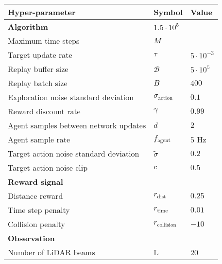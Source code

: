 
\begin{table}[htb!]
\centering
\small
\begin{tabularx}{0.75\textwidth}{RCL} 
    \hline
    \textbf{Hyper-parameter} & \textbf{Symbol} & \textbf{Value} \\ 
    \hline
    \textbf{Algorithm}                      & $1.5 \cdot 10^5$          & \\
    Maximum time steps                      & $M$                       &  \\
    Target update rate                      & $\tau$                    & $5\cdot10^{-3}$ \\
    Replay buffer size                      & $\mathcal{B}$             & $5\cdot 10^5$ \\
    Replay batch size                       & $B$                       & $400$ \\
    Exploration noise standard deviation    & $\sigma_{\text{action}}$  & $0.1$ \\
    Reward discount rate                    & $\gamma$                  & $0.99$ \\
    Agent samples between network updates   & $d$                       & $2$ \\
    Agent sample rate                       & $f_{\text{agent}}$        & $5$ Hz \\
    Target action noise standard deviation  & $\tilde{\sigma}$          & $0.2$ \\ 
    Target action noise clip                & $c$                       & $0.5$ \\
    \textbf{Reward signal}                  &                           & \\
    Distance reward                         & $r_{\text{dist}}$         & $0.25$ \\ 
    Time step penalty                       & $r_{\text{time}}$         & $0.01$ \\
    Collision penalty                       & $r_{\text{collision}}$    & $-10$ \\
    \textbf{Observation}                    &                           & \\
    Number of LiDAR beams                   & L                         & 20 \\

\end{tabularx}
\end{table}
